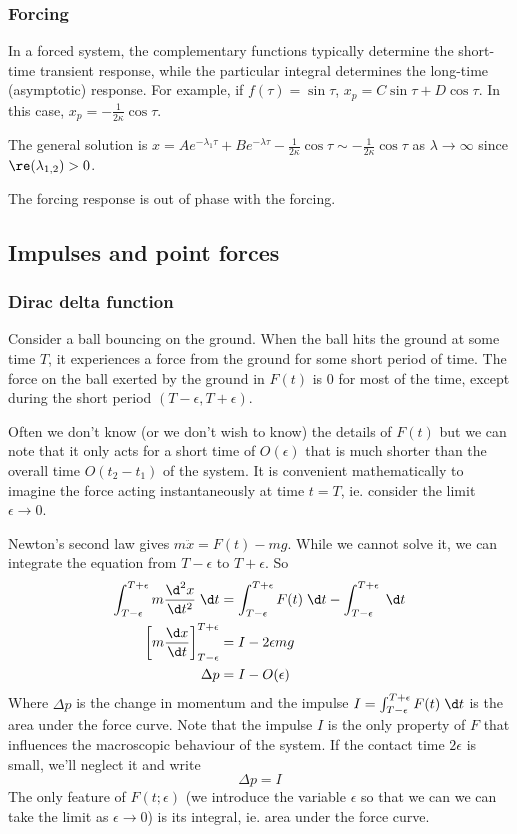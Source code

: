 \documentclass[a4paper]{article}
\begin{document}
  \subsubsection{Forcing}
  In a forced system, the complementary functions typically determine the short-time transient response, while the particular integral determines the long-time (asymptotic) response.
  For example, if $f(\tau) = \sin\tau$, $x_p = C\sin \tau + D\cos\tau$. In this case, $x_p = -\frac{1}{2\kappa}\cos\tau$.

  The general solution is $x = Ae^{-\lambda_1\tau} + Be^{-\lambda \tau} - \frac{1}{2\kappa}\cos\tau \sim -\frac{1}{2\kappa}\cos\tau$ as $\lambda\to \infty$ since $\re (\lambda_{1, 2}) > 0$.

  \note The forcing response is out of phase with the forcing.
  \subsection{Impulses and point forces}
  \subsubsection{Dirac delta function}
  Consider a ball bouncing on the ground. When the ball hits the ground at some time $T$, it experiences a force from the ground for some short period of time. The force on the ball exerted by the ground in $F(t)$ is $0$ for most of the time, except during the short period $(T - \epsilon, T + \epsilon)$.

  Often we don't know (or we don't wish to know) the details of $F(t)$ but we can note that it only acts for a short time of $O(\epsilon)$ that is much shorter than the overall time $O(t_2 - t_1)$ of the system. It is convenient mathematically to imagine the force acting instantaneously at time $t = T$, ie. consider the limit $\epsilon\to 0$.

  Newton's second law gives $m\ddot x = F(t) - mg$. While we cannot solve it, we can integrate the equation from $T - \epsilon$ to $T + \epsilon$. So 
  \begin{align*}
    \int_{T - \epsilon}^{T + \epsilon} m\frac{\d ^2 x}{\d t^2}\;\d t &= \int_{T - \epsilon}^{T + \epsilon} F(t)\;\d t - \int_{T - \epsilon}^{T + \epsilon}\;\d t\\
    \left[ m\frac{\d x}{\d t}\right]^{T + \epsilon}_{T - \epsilon} &= I - 2\epsilon mg\\
    \Delta p &= I - O(\epsilon)
  \end{align*}
  Where $\Delta p$ is the change in momentum and the impulse $I = \int_{T - \epsilon}^{T + \epsilon} F(t) \;\d t$ is the area under the force curve. Note that the impulse $I$ is the only property of $F$ that influences the macroscopic behaviour of the system. If the contact time $2\epsilon$ is small, we'll neglect it and write 
  \[
    \Delta p = I
  \]
  The only feature of $F(t; \epsilon)$ (we introduce the variable $\epsilon$ so that we can we can take the limit as $\epsilon \to 0$) is its integral, ie. area under the force curve.
\end{document}
